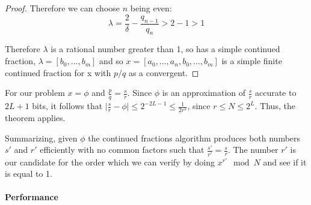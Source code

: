 \begin{proof}
Therefore we can choose $n$ being even: 
\begin{equation*}
    \lambda = \frac{2}{\delta} - \frac{q_{n-1}}{q_n} > 2 - 1 > 1
\end{equation*}

Therefore $\lambda$ is a rational number greater than 1, so has a simple continued fraction, $\lambda = [b_0, \dots, b_m]$ and so $x = [a_0, \dots, a_n, b_0, \dots, b_m]$ is a simple finite continued fraction for x with $p/q$ as a convergent.
\end{proof}

For our problem $x=\phi$ and $\frac{p}{q} = \frac{s}{r}$. Since $\phi$ is an approximation of $\frac{s}{r}$ accurate to $2L + 1$ bits, it follows that $\big| \frac{s}{r} - \phi \big| \leq 2^{-2L-1} \leq \frac{1}{2 r^2}$, since $r \leq N \leq 2^L$. Thus, the theorem applies.

Summarizing, given $\phi$ the continued fractions algorithm produces both numbers $s'$ and $r'$ efficiently with no common factors such that $\frac{s'}{r'} = \frac{s}{r}$. The number $r'$ is our candidate for the order which we can verify by doing $x^{r'} \mod N$ and see if it is equal to 1.

\paragraph{Performance}

